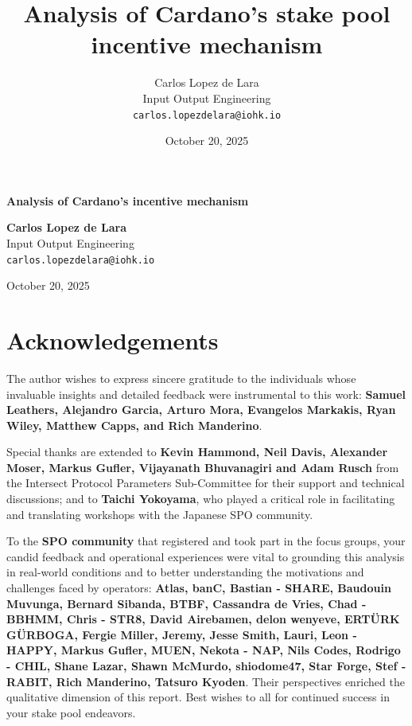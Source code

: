 \documentclass[11pt, letterpaper]{article}
\title{Analysis of Cardano's stake pool incentive mechanism}
\author{
    Carlos Lopez de Lara \\
    Input Output Engineering \\
    \texttt{carlos.lopezdelara@iohk.io}
}
\date{October 20, 2025}
\begin{document}
\begin{titlepage}
    \centering %
    
    \vfill %
    
    {\Huge \textbf{Analysis of Cardano's incentive mechanism}}
    
    \vfill 
    
    {
        \Large \textbf{Carlos Lopez de Lara} \\
        \vspace{1em} 
        \large Input Output Engineering \\
        \large \texttt{carlos.lopezdelara@iohk.io}
    }
    
    \vfill
    
    {\large October 20, 2025}
    
    \vfill 
\end{titlepage}

\thispagestyle{empty} 

\tableofcontents
\newpage
\pagestyle{fancy} 

\newpage

\section*{Acknowledgements}

The author wishes to express sincere gratitude to the individuals whose 
invaluable insights and detailed feedback were instrumental to this work: 
\textbf{Samuel Leathers, Alejandro Garcia, Arturo Mora, Evangelos Markakis, Ryan Wiley, 
Matthew Capps, and Rich Manderino}.

Special thanks are extended to \textbf{Kevin Hammond, Neil Davis, Alexander Moser, Markus Gufler, 
Vijayanath Bhuvanagiri and Adam Rusch} from the Intersect Protocol Parameters Sub-Committee for 
their support and technical discussions; and to \textbf{Taichi Yokoyama}, who played a critical role in
facilitating and translating workshops with the Japanese SPO community.

To the \textbf{SPO community} that registered and took part in the focus groups, your candid 
feedback and operational experiences were vital to grounding this analysis in real-world conditions
and to better understanding the motivations and challenges faced by operators: \textbf{Atlas, banC, Bastian - SHARE, 
Baudouin Muvunga, Bernard Sibanda, BTBF, Cassandra de Vries, Chad - BBHMM, Chris - STR8, 
David Airebamen, delon wenyeve, ERTÜRK GÜRBOGA, Fergie Miller, Jeremy, Jesse Smith, Lauri, Leon - HAPPY, 
Markus Gufler, MUEN, Nekota - NAP, Nils Codes, Rodrigo - CHIL, Shane Lazar, Shawn McMurdo, 
shiodome47, Star Forge, Stef - RABIT, Rich Manderino, Tatsuro Kyoden}. Their perspectives enriched the qualitative dimension of this 
report. Best wishes to all for continued success in your stake pool endeavors.
\end{document}
